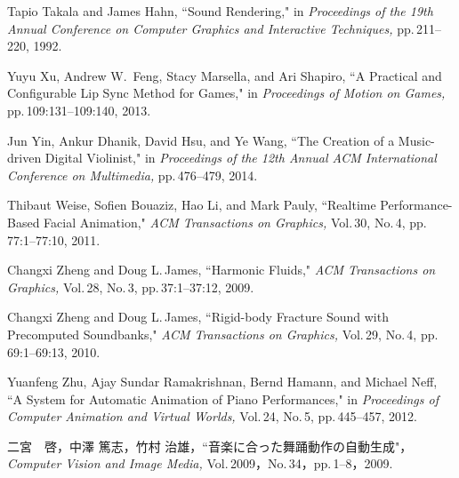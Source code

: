 \begin{thebibliography}{55}
Tapio Takala and James Hahn,
 ``Sound Rendering,"
 in \textit{Proceedings of the 19th Annual Conference on Computer Graphics and Interactive Techniques,} pp.\,211--220, 1992.

Yuyu Xu, Andrew W.\, Feng, Stacy Marsella, and Ari Shapiro,
 ``A Practical and Configurable Lip Sync Method for Games,"
 in \textit{Proceedings of Motion on Games,} pp.\,109:131--109:140, 2013.

Jun Yin, Ankur Dhanik, David Hsu, and Ye Wang,
 ``The Creation of a Music-driven Digital Violinist,"
 in \textit{Proceedings of the 12th Annual ACM International Conference on Multimedia,} pp.\,476--479, 2014.

Thibaut Weise, Sofien Bouaziz, Hao Li, and Mark Pauly,
 ``Realtime Performance-Based Facial Animation,"
 \textit{ACM Transactions on Graphics,} Vol.\,30, No.\,4, pp.\,77:1--77:10, 2011.

Changxi Zheng and Doug L.\,James,
 ``Harmonic Fluids,"
 \textit{ACM Transactions on Graphics,} Vol.\,28, No.\,3, pp.\,37:1--37:12, 2009.

Changxi Zheng and Doug L.\,James,
 ``Rigid-body Fracture Sound with Precomputed Soundbanks,"
 \textit{ACM Transactions on Graphics,} Vol.\,29, No.\,4, pp.\,69:1--69:13, 2010.

Yuanfeng Zhu, Ajay Sundar Ramakrishnan, Bernd Hamann, and Michael Neff,
 ``A System for Automatic Animation of Piano Performances,"
 in \textit{Proceedings of Computer Animation and Virtual Worlds,} Vol.\,24, No.\,5, pp.\,445--457, 2012.
 
二宮　啓，中澤 篤志，竹村 治雄，``音楽に合った舞踊動作の自動生成"，
 \textit{Computer Vision and Image Media,} Vol.\,2009，No.\,34，pp.\,1--8，2009.

\end{thebibliography}